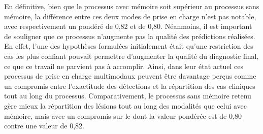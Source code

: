 En définitive, bien que le processus avec mémoire soit supérieur au processus sans mémoire, la différence entre ces deux modes de prise en charge n'est pas notable, avec respectivement un \fscore{} pondéré de 0,82 et de 0,80. Néanmoins, il est important de souligner que ce processus n'augmente pas la qualité des prédictions réalisées. En effet, l'une des hypothèses formulées initialement était qu'une restriction des cas les plus confiant pouvait permettre d'augmenter la qualité du diagnostic final, ce que ce travail ne parvient pas à accomplir. Ainsi, dans leur état actuel ces processus de prise en charge multimodaux peuvent être davantage perçus comme un compromis entre l'exactitude des détections et la répartition des cas cliniques tout au long du processus. Comparativement, le processus sans mémoire retenu gère mieux la répartition des lésions tout au long des modalités que celui avec mémoire, mais avec un compromis sur le \fscore{} dont la valeur pondérée est de 0,80 contre une valeur de 0,82.\par

